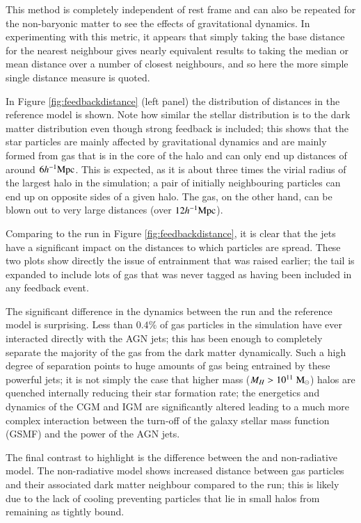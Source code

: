 This method is completely independent of rest frame and can also be repeated
for the non-baryonic matter to see the effects of gravitational dynamics. In
experimenting with this metric, it appears that simply taking the base
distance for the nearest neighbour gives nearly equivalent results to taking
the median or mean distance over a number of closest neighbours, and so here
the more simple single distance measure is quoted.

In Figure \ref{fig:feedbackdistance} (left panel) the distribution of
distances in the reference model is shown. Note how similar the stellar
distribution is to the dark matter distribution even though strong feedback is
included; this shows that the star particles are mainly affected by
gravitational dynamics and  are mainly formed from gas that is in the core of
the halo and can only end up distances of around $6 h^{-1}{\rm Mpc}{}$. This is
expected, as it is about three times the virial radius of the largest halo in
the simulation; a pair of initially neighbouring particles can end up on
opposite sides of a given halo. The gas, on the other hand, can be blown out
to very large distances (over $12 h^{-1}{\rm Mpc}{}$).

Comparing to the \nojet{} run in Figure \ref{fig:feedbackdistance}, it is clear
that the jets have a significant impact on the distances to which particles
are spread. These two plots show directly the issue of entrainment that was
raised earlier; the tail is expanded to include lots of gas that was never
tagged as having been included in any feedback event.

The significant difference in the dynamics between the \nojet{} run and the
reference model is surprising. Less than $0.4\%$ of gas particles in the simulation
have ever interacted directly with the AGN jets; this has been enough
to completely separate the majority of the gas from the dark matter dynamically.
Such a high degree of separation points to huge amounts of gas being entrained
by these powerful jets; it is not simply the case that higher mass ($M_H >
10^{11} \;{\rm M}_{\odot}{}$) halos are quenched internally reducing their star formation
rate; the energetics and dynamics of the CGM and IGM are significantly altered
leading to a much more complex interaction between the turn-off of the
galaxy stellar mass function (GSMF) and the power of the AGN jets.

The final contrast to highlight is the difference between the \nojet{} and
non-radiative model. The non-radiative model shows increased distance between
gas particles and their associated dark matter neighbour compared to the
\nojet{} run; this is likely due to the lack of cooling preventing particles
that lie in small halos from remaining as tightly bound.

